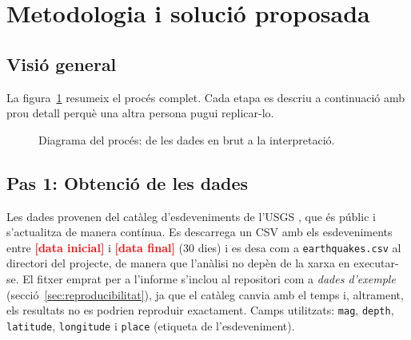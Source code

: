 \documentclass[11pt,a4paper]{article}
\newcommand{\pend}[1]{\textcolor{red}{\textbf{[#1]}}}
\begin{document}
\section{Metodologia i solució proposada}\label{sec:metodologia}

\subsection{Visió general}
La figura~\ref{fig:pipeline} resumeix el procés complet. Cada etapa es descriu
a continuació amb prou detall perquè una altra persona pugui replicar-lo.

\begin{figure}[htbp]
\centering
{}
\caption{Diagrama del procés: de les dades en brut a la interpretació.}
\label{fig:pipeline}
\end{figure}

\subsection{Pas 1: Obtenció de les dades}
Les dades provenen del catàleg d'esdeveniments de l'USGS \cite{usgs}, que és
públic i s'actualitza de manera contínua. Es descarrega un CSV amb els
esdeveniments entre \pend{data inicial} i \pend{data final} (30 dies) i es desa
com a \texttt{earthquakes.csv} al directori del projecte, de manera que
l'anàlisi no depèn de la xarxa en executar-se. El fitxer emprat per a
l'informe s'inclou al repositori com a \emph{dades d'exemple}
(secció~\ref{sec:reproducibilitat}), ja que el catàleg canvia amb el temps i,
altrament, els resultats no es podrien reproduir exactament. Camps
utilitzats: \texttt{mag}, \texttt{depth}, \texttt{latitude},
\texttt{longitude} i \texttt{place} (etiqueta de l'esdeveniment).
\end{document}
